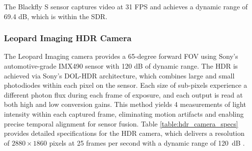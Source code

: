 \documentclass{erauthesis}
\begin{document}
The Blackfly S sensor captures video at 31 \ac{FPS} and achieves a dynamic range of 69.4 dB, which is within the \ac{SDR}.

\subsubsection{Leopard Imaging HDR Camera} \label{sensors_HDR}

The Leopard Imaging camera provides a 65-degree forward \ac{FOV} using Sony’s automotive-grade IMX490 sensor with 120 dB of dynamic range.
The \ac{HDR} is achieved via Sony’s \ac{DOL-HDR} architecture, which combines large and small photodiodes within each pixel on the sensor.
Each size of sub-pixels experience a different photon flux during each frame of exposure, and each output is read at both high and low conversion gains.
This method yields 4 measurements of light intensity within each captured frame, eliminating motion artifacts and enabling precise temporal alignment for sensor fusion.
Table \ref{table:hdr_camera_specs} provides detailed specifications for the HDR camera, which delivers a resolution of $2880 \times 1860$ pixels at 25 frames per second with a dynamic range of 120~dB
.%

\end{document}
